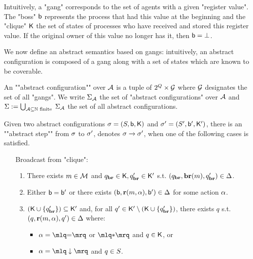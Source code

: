 Intuitively, a "gang" corresponds to the set of agents with a given "register value". The "boss" $\mathsf{b}$ represents the process that had this value at the beginning and the "clique" $\mathsf{K}$ the set of states of processes who have received and stored this register value. If the original owner of this value no longer has it, then $\mathsf{b} = \bot$.




We now define an abstract semantics based on gangs: intuitively, an abstract configuration is composed of a gang along with a set of states which are known to be coverable.

\begin{definition}
\label{def:abstract-configuration}
An ""abstract configuration"" over $\mathcal{A}$ is a tuple of $2^Q \times \mathcal{G}$ where $\mathcal{G}$ designates the set of all "gangs". We write $\Sigma_{\mathcal{A}}$ the set of "abstract configurations" over $\mathcal{A}$ and $\Sigma := \bigcup_{\mathcal{A} \subseteq \mathbb{N} \text{ finite }}\Sigma_{\mathcal{A}}$ the set of all abstract configurations. 

Given two abstract configurations $\sigma = (S, \mathsf{b}, \mathsf{K})$ and $\sigma' = (S', \mathsf{b}', \mathsf{K}')$, there is an ""abstract step"" from $\sigma$ to $\sigma'$, denotes $\sigma \xrightarrow{} \sigma'$, when one of the following cases is satisfied.
\begin{enumerate}
\item[Broadcast from "clique":] 
	\begin{enumerate}[label=(\roman*)]
		\item\label{item:broadcast_from_clique_broadcast} There exists $m \in \mathcal{M}$ and $q_{\textbf{br}} \in \mathsf{K}, q_{\textbf{br}}' \in \mathsf{K}'$ s.t. $(q_{\textbf{br}}, \textbf{br}(m), q_{\textbf{br}}') \in \Delta$. 
		
		\item\label{item:broadcast_from_clique_boss} Either $\mathsf{b} = \mathsf{b}'$ or there exists $(\mathsf{b}, \textbf{r}(m, \alpha), \mathsf{b}') \in \Delta$ for some action $\alpha$.

		\item\label{item:broadcast_from_clique_clique}$(\mathsf{K} \cup \{q_{\textbf{br}}'\}) \subseteq \mathsf{K}'$ and, for all $q' \in \mathsf{K}' \setminus (\mathsf{K} \cup \{q_{\textbf{br}}'\})$, there exists $q$ s.t. $(q, \textbf{r}(m, \alpha), q') \in \Delta$ where:
		\begin{itemize}
			\item $\anact = \quotemarks{\eqtestact}$ or $\quotemarks{\dummyact}$ and $q \in \mathsf{K}$, or
			\item $\anact= \quotemarks{\enregact}$ and $q \in S$.
		\end{itemize}
		

\end{enumerate}
\end{enumerate}
\end{definition}
